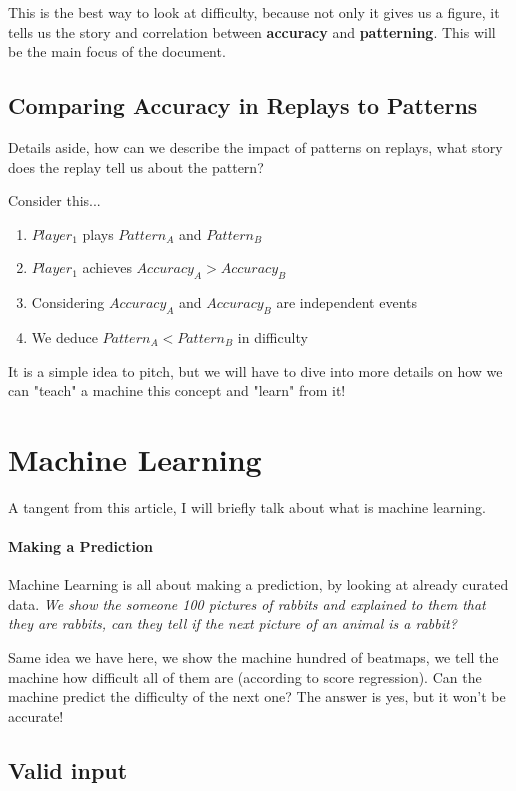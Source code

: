 \documentclass{article}
\begin{document}
This is the best way to look at difficulty, because not only it gives us a figure, it tells us the story and correlation between \textbf{accuracy} and \textbf{patterning}. This will be the main focus of the document.

\subsection{Comparing Accuracy in Replays to Patterns}

Details aside, how can we describe the impact of patterns on replays, what story does the replay tell us about the pattern?

Consider this...
\begin{enumerate}
	\item $Player_1$ plays $Pattern_A$ and $Pattern_B$
	\item $Player_1$ achieves $Accuracy_A > Accuracy_B$
	\item Considering $Accuracy_A$ and $Accuracy_B$ are independent events
	\item We deduce $Pattern_A < Pattern_B$ in difficulty
\end{enumerate}

It is a simple idea to pitch, but we will have to dive into more details on how we can "teach" a machine this concept and "learn" from it!

\section{Machine Learning}

A tangent from this article, I will briefly talk about what is machine learning.

\paragraph{Making a Prediction} Machine Learning is all about making a prediction, by looking at already curated data. \textit{We show the someone 100 pictures of rabbits and explained to them that they are rabbits, can they tell if the next picture of an animal is a rabbit?}

Same idea we have here, we show the machine hundred of beatmaps, we tell the machine how difficult all of them are (according to score regression). Can the machine predict the difficulty of the next one? The answer is yes, but it won't be accurate!

\subsection{Valid input}
\end{document}
